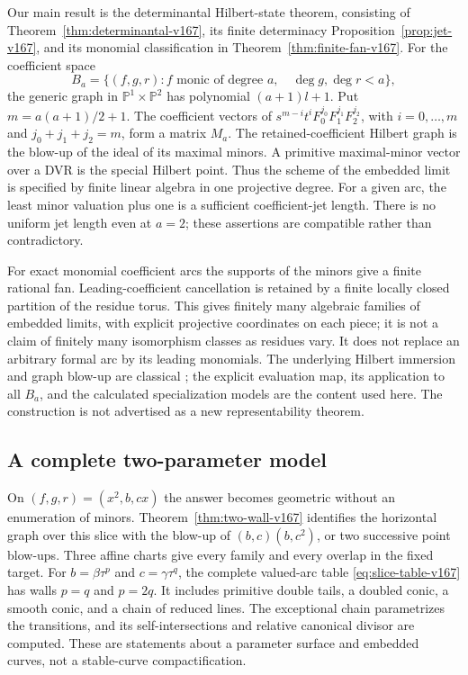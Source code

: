 \documentclass[11pt,reqno]{amsart}
\numberwithin{equation}{section}
\theoremstyle{definition}\newtheorem{definition}[theorem]{Definition}
\theoremstyle{remark}\newtheorem{remark}[theorem]{Remark}
\newcommand{\Pj}{\mathbb P}\newcommand{\A}{\mathbb A}
\begin{document}
Our main result is the determinantal Hilbert-state theorem, consisting
of Theorem~\ref{thm:determinantal-v167}, its finite determinacy
Proposition~\ref{prop:jet-v167}, and its monomial classification in
Theorem~\ref{thm:finite-fan-v167}. For the coefficient space
\[
 B_a=\{(f,g,r):f\text{ monic of degree }a,\quad\deg g,\deg r<a\},
\]
the generic graph in $\Pj^1\times\Pj^2$ has polynomial $(a+1)l+1$.
Put $m=a(a+1)/2+1$. The coefficient vectors of
$s^{m-i}t^i F_0^{j_0}F_1^{j_1}F_2^{j_2}$, with
$i=0,\ldots,m$ and $j_0+j_1+j_2=m$, form a matrix $M_a$.
The retained-coefficient Hilbert graph is the blow-up of the ideal
of its maximal minors. A primitive maximal-minor vector over a DVR
is the special Hilbert point. Thus the scheme of the embedded limit
is specified by finite linear algebra in one projective degree.
For a given arc, the least minor valuation plus one is a sufficient
coefficient-jet length. There is no uniform jet length even at
$a=2$; these assertions are compatible rather than contradictory.

For exact monomial coefficient arcs the supports of the minors give
a finite rational fan. Leading-coefficient cancellation is retained
by a finite locally closed partition of the residue torus. This gives
finitely many algebraic families of embedded limits, with explicit
projective coordinates on each piece; it is not a claim of finitely
many isomorphism classes as residues vary. It does not replace an
arbitrary formal arc by its leading monomials. The underlying
Hilbert immersion and graph blow-up are classical
\cite{Grothendieck166,Gotzmann167}; the explicit evaluation map,
its application to all $B_a$, and the calculated specialization
models are the content used here. The construction is not advertised
as a new representability theorem.

\subsection{A complete two-parameter model}
On $(f,g,r)=(x^2,b,cx)$ the answer becomes geometric without an
enumeration of minors. Theorem~\ref{thm:two-wall-v167} identifies
the horizontal graph over this slice with the blow-up of
$(b,c)(b,c^2)$, or two successive point blow-ups. Three affine
charts give every family and every overlap in the fixed target.
For $b=\beta\tau^p$ and $c=\gamma\tau^q$, the complete valued-arc table
\eqref{eq:slice-table-v167} has walls $p=q$ and $p=2q$.
It includes primitive double tails, a doubled conic, a smooth conic,
and a chain of reduced lines. The exceptional chain parametrizes
the transitions, and its self-intersections and relative canonical
divisor are computed. These are statements about a parameter
surface and embedded curves, not a stable-curve compactification.
\end{document}
